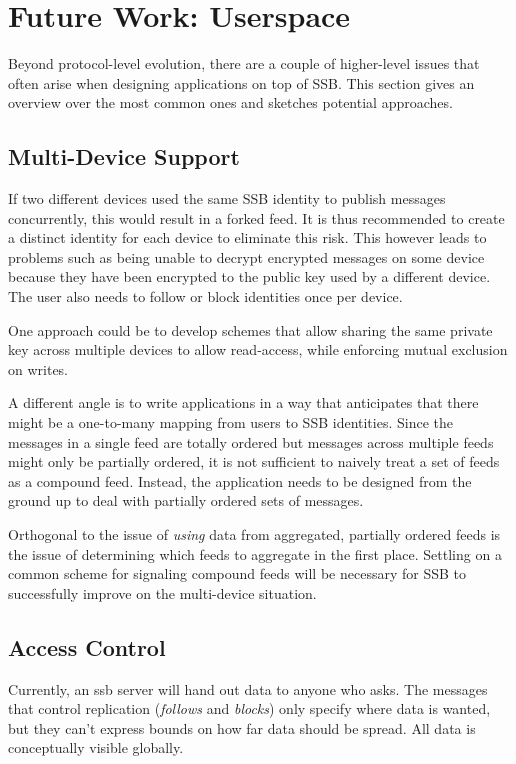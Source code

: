 \documentclass[sigconf]{acmart}
\begin{document}
\section{Future Work: Userspace}

Beyond protocol-level evolution, there are a couple of higher-level issues that often arise when designing applications on top of SSB. This section gives an overview over the most common ones and sketches potential approaches.

\subsection{Multi-Device Support}

If two different devices used the same SSB identity to publish messages concurrently, this would result in a forked feed. It is thus recommended to create a distinct identity for each device to eliminate this risk. This however leads to problems such as being unable to decrypt encrypted messages on some device because they have been encrypted to the public key used by a different device. The user also needs to follow or block identities once per device.

One approach could be to develop schemes that allow sharing the same private key across multiple devices to allow read-access, while enforcing mutual exclusion on writes.

A different angle is to write applications in a way that anticipates that there might be a one-to-many mapping from users to SSB identities. Since the messages in a single feed are totally ordered but messages across multiple feeds might only be partially ordered, it is not sufficient to naively treat a set of feeds as a compound feed. Instead, the application needs to be designed from the ground up to deal with partially ordered sets of messages.

Orthogonal to the issue of \textit{using} data from aggregated, partially ordered feeds is the issue of determining which feeds to aggregate in the first place. Settling on a common scheme for signaling compound feeds will be necessary for SSB to successfully improve on the multi-device situation.

\subsection{Access Control}

Currently, an ssb server will hand out data to anyone who asks. The messages that control replication (\textit{follows} and \textit{blocks}) only specify where data is wanted, but they can't express bounds on how far data should be spread. All data is conceptually visible globally.
\end{document}
